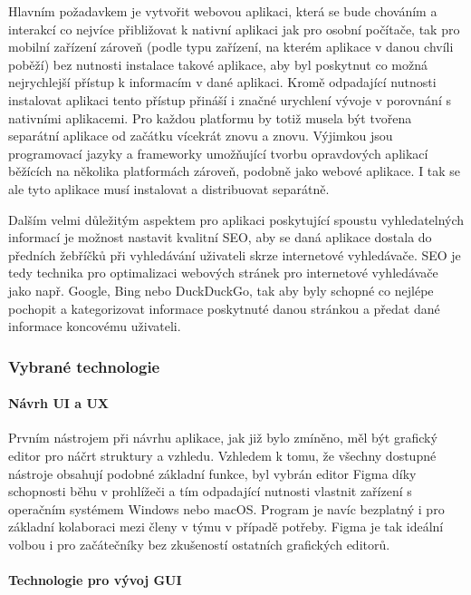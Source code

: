 		Hlavním požadavkem je vytvořit webovou aplikaci, která se bude chováním a interakcí co nejvíce přibližovat
		k nativní aplikaci jak pro osobní počítače, tak pro mobilní zařízení zároveň (podle typu zařízení, na kterém aplikace
		v danou chvíli poběží) bez nutnosti instalace takové aplikace, aby byl poskytnut co možná nejrychlejší přístup
		k informacím v dané aplikaci.
		Kromě odpadající nutnosti instalovat aplikaci tento přístup přináší i značné urychlení vývoje v porovnání s
		nativními aplikacemi.
		Pro každou platformu by totiž musela být tvořena separátní aplikace od začátku vícekrát znovu a znovu.
		Výjimkou jsou programovací jazyky a frameworky umožňující tvorbu opravdových aplikací běžících na několika
		platformách zároveň, podobně jako webové aplikace.
		I tak se ale tyto aplikace musí instalovat a distribuovat separátně.

		Dalším velmi důležitým aspektem pro aplikaci poskytující spoustu vyhledatelných informací je možnost nastavit
		kvalitní SEO, aby se daná aplikace dostala do předních žebříčků při vyhledávání uživateli skrze internetové
		vyhledávače.
		\noindent\Ac{SEO} je tedy technika pro optimalizaci webových stránek pro internetové vyhledávače jako např.
		Google, Bing nebo DuckDuckGo, tak aby byly schopné co nejlépe pochopit a kategorizovat informace poskytnuté
		danou stránkou a předat dané informace koncovému uživateli. \cite{what_is_seo}

		\subsubsection{Vybrané technologie}

			\paragraph{Návrh UI a UX}

			Prvním nástrojem při návrhu aplikace, jak již bylo zmíněno, měl být grafický editor pro náčrt struktury a vzhledu.
			Vzhledem k tomu, že všechny dostupné nástroje obsahují podobné základní funkce, byl vybrán editor Figma díky
			schopnosti běhu v prohlížeči a tím odpadající nutnosti vlastnit zařízení s operačním systémem Windows nebo macOS.
			Program je navíc bezplatný i pro základní kolaboraci mezi členy v týmu v případě potřeby.
			Figma je tak ideální volbou i pro začátečníky bez zkušeností ostatních grafických editorů.

			\paragraph{Technologie pro vývoj GUI}

